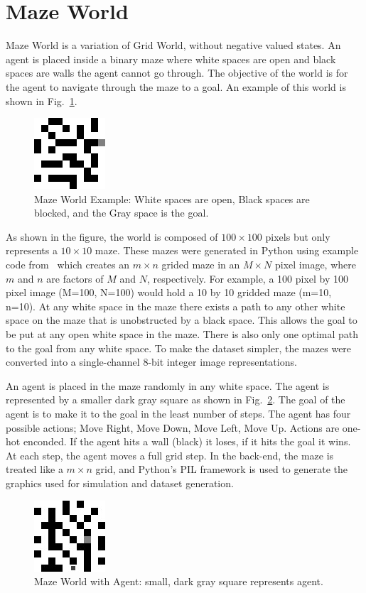 \documentclass[12pt,american]{report}
\begin{document}
\section{Maze World}
Maze World is a variation of Grid World, without negative valued states.  An agent is placed inside a binary maze where white spaces are open and black spaces are walls the agent cannot go through.  The objective of the world is for the agent to navigate through the maze to a goal.  An example of this world is shown in Fig.~\ref{fig:maze_world_example}.
\begin{figure}
\centering
\includegraphics[scale=1.25]{images/maze_world_example.png}
\caption{Maze World Example: White spaces are open, Black spaces are blocked, and the Gray space is the goal.}
\label{fig:maze_world_example}
\end{figure}
As shown in the figure, the world is composed of $100\times 100$ pixels but only represents a $10\times 10$ maze.  These mazes were generated in Python using example code from~\cite{maze_code} which creates an $m\times n$ grided maze in an $M\times N$ pixel image, where $m$ and $n$ are factors of $M$ and $N$, respectively. For example, a 100 pixel by 100 pixel image (M=100, N=100) would hold a 10 by 10 gridded maze (m=10, n=10). At any white space in the maze there exists a path to any other white space on the maze that is unobstructed by a black space.  This allows the goal to be put at any open white space in the maze.  There is also only one optimal path to the goal from any white space. To make the dataset simpler, the mazes were converted into a single-channel 8-bit integer image representations.  

An agent is placed in the maze randomly in any white space.  The agent is represented by a smaller dark gray square as shown in Fig.~\ref{fig:maze_with_agent}. The goal of the agent is to make it to the goal in the least number of steps.  The agent has four possible actions; Move Right, Move Down, Move Left, Move Up. Actions are one-hot enconded. If the agent hits a wall (black) it loses, if it hits the goal it wins. At each step, the agent moves a full grid step.  In the back-end, the maze is treated like a $m\times n$ grid, and Python's PIL framework is used to generate the graphics used for simulation and dataset generation.
\begin{figure}
\centering
\includegraphics[scale=1.5]{images/maze_with_agent.jpg}
\caption{Maze World with Agent: small, dark gray square represents agent.}
\label{fig:maze_with_agent}
\end{figure}
\end{document}

